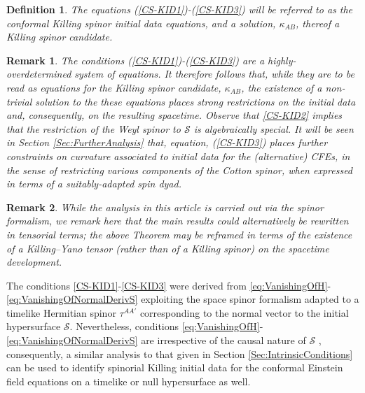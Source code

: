 \documentclass[10pt,a4paper]{article}
\theoremstyle{plain}
\newtheorem*{definition}{Definition}
\newtheorem{remark}{Remark}
\begin{document}
\begin{definition}
\emph{ The equations (\ref{CS-KID1})-(\ref{CS-KID3}) will be referred
  to as the \emph{conformal Killing spinor initial data equations},
  and a solution, $\kappa_{AB}$, thereof a \emph{Killing spinor
    candidate}.  }
\end{definition}
\begin{remark}\label{Remark:ConformalKIDsOverdetermined}
\emph{The conditions (\ref{CS-KID1})-(\ref{CS-KID3}) are a
  highly-overdetermined system of equations. It therefore follows
  that, while they are to be read as equations for the Killing spinor
  candidate, $\kappa_{AB}$, the existence of a non-trivial solution to
  the these equations places strong restrictions on the initial data and,
  consequently, on the resulting spacetime.  Observe that
  \eqref{CS-KID2} implies that the restriction of the Weyl spinor to
  $\mathcal{S}$ is algebraically special.
It will be seen in Section \ref{Sec:FurtherAnalysis} that, equation,
(\ref{CS-KID3}) places further constraints on curvature associated to
initial data for the (alternative) CFEs, in the sense of restricting
various components of the Cotton spinor, when expressed in terms of a
suitably-adapted spin dyad.  }
\end{remark}
\begin{remark}
\emph{
While the analysis in this article is carried out via the spinor
formalism, we remark here that the main results could  alternatively be
rewritten in tensorial terms; the above Theorem may be reframed in
terms of the existence of a Killing--Yano tensor (rather than of a
Killing spinor) on the spacetime development.
}
\end{remark}

The conditions \eqref{CS-KID1}-\eqref{CS-KID3} were derived
  from \eqref{eq:VanishingOfH}-\eqref{eq:VanishingOfNormalDerivS}
  exploiting the space spinor formalism adapted to a timelike
  Hermitian spinor $\tau^{AA'}$ corresponding to the normal vector to
  the initial hypersurface $\mathcal{S}$. Nevertheless, conditions
  \eqref{eq:VanishingOfH}-\eqref{eq:VanishingOfNormalDerivS} are
  irrespective of the causal nature of $\mathcal{S}$ , consequently, a
  similar analysis to that given in Section
  \ref{Sec:IntrinsicConditions} can be used to identify spinorial
  Killing initial data for the conformal Einstein field equations on a
  timelike or null hypersurface as well. 
\end{document}

